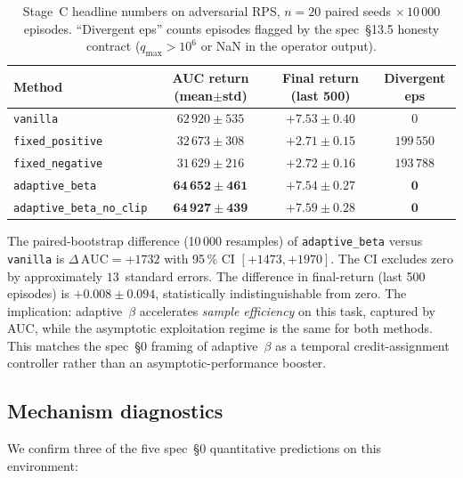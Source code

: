 \begin{table}[h]
\small
\centering
\begin{tabular}{lccc}
\toprule
Method & AUC return (mean$\pm$std) & Final return (last 500) & Divergent eps \\
\midrule
\texttt{vanilla} & $62\,920\pm 535$ & $+7.53\pm0.40$ & $0$ \\
\texttt{fixed\_positive} & $32\,673\pm 308$ & $+2.71\pm0.15$ & $199\,550$ \\
\texttt{fixed\_negative} & $31\,629\pm 216$ & $+2.72\pm0.16$ & $193\,788$ \\
\texttt{adaptive\_beta} & $\mathbf{64\,652\pm 461}$ & $+7.54\pm0.27$ & $\mathbf{0}$ \\
\texttt{adaptive\_beta\_no\_clip} & $\mathbf{64\,927\pm 439}$ & $+7.59\pm0.28$ & $\mathbf{0}$ \\
\bottomrule
\end{tabular}
\caption{Stage~C headline numbers on adversarial RPS, $n=20$ paired
seeds $\times\,10\,000$ episodes.  ``Divergent eps'' counts episodes
flagged by the spec~§13.5 honesty contract ($q_{\max}>10^6$ or NaN
in the operator output).}
\label{tab:phase_vii_headline}
\end{table}

The paired-bootstrap difference (10\,000 resamples) of \texttt{adaptive\_beta}
versus \texttt{vanilla} is $\Delta\,\mathrm{AUC}=+1732$ with 95\,\% CI
$[+1473,+1970]$.  The CI excludes zero by approximately $13$~standard
errors.  The difference in final-return (last 500 episodes) is
$+0.008\pm0.094$, statistically indistinguishable from zero.  The
implication: adaptive~$\beta$ accelerates \emph{sample efficiency} on
this task, captured by AUC, while the asymptotic exploitation regime
is the same for both methods.  This matches the spec~§0 framing of
adaptive~$\beta$ as a temporal credit-assignment controller rather than
an asymptotic-performance booster.

\subsection{Mechanism diagnostics}

We confirm three of the five spec~§0 quantitative predictions on this
environment:

